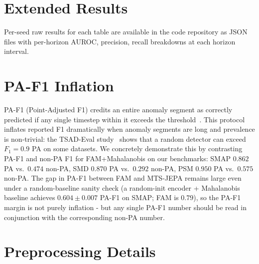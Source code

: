 \documentclass{article}
\begin{document}
\section{Extended Results}
\label{app:extended}

Per-seed raw results for each table are available in the code repository as JSON files with per-horizon AUROC, precision, recall breakdowns at each horizon interval.

\section{PA-F1 Inflation}
\label{app:pa_f1}

PA-F1 (Point-Adjusted F1) credits an entire anomaly segment as correctly predicted if any single timestep within it exceeds the threshold~\citep{xu2022anomalytransformer}. This protocol inflates reported F1 dramatically when anomaly segments are long and prevalence is non-trivial: the TSAD-Eval study~\citep{schmidl2022tsadeval} shows that a random detector can exceed $F_1 = 0.9$ PA on some datasets. We concretely demonstrate this by contrasting PA-F1 and non-PA F1 for FAM+Mahalanobis on our benchmarks: SMAP $0.862$ PA vs.\ $0.474$ non-PA, SMD $0.870$ PA vs.\ $0.292$ non-PA, PSM $0.950$ PA vs.\ $0.575$ non-PA. The gap in PA-F1 between FAM and MTS-JEPA remains large even under a random-baseline sanity check (a random-init encoder + Mahalanobis baseline achieves $0.604 \pm 0.007$ PA-F1 on SMAP; FAM is $0.79$), so the PA-F1 margin is not purely inflation - but any single PA-F1 number should be read in conjunction with the corresponding non-PA number.

\section{Preprocessing Details}
\label{app:preprocessing}
\end{document}

